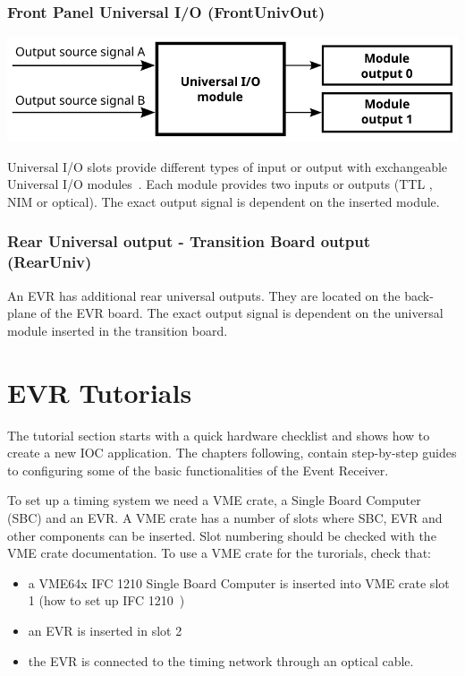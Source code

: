 \documentclass[12pt,a4paper]{article}
\begin{document}
\subsubsection{Front Panel Universal I/O (FrontUnivOut)}

	\includegraphics[]{./img/univ}

Universal I/O slots provide different types of input or output with exchangeable Universal I/O modules~\cite{mrf_modules}. Each module provides two inputs or outputs (TTL , NIM or optical). 
The exact output signal is dependent on the inserted module.

\subsubsection{Rear Universal output - Transition Board output (RearUniv)}
An EVR has additional rear universal outputs. They are located on the back-plane of the EVR board. The exact output signal is dependent on the universal module inserted in the transition board.

\section{EVR Tutorials}
The tutorial section starts with a quick hardware checklist and shows how to create a new IOC application. The chapters following, contain step-by-step guides to configuring some of the basic functionalities of the Event Receiver.

To set up a timing system we need a VME crate, a Single Board Computer (SBC) and an EVR. A VME crate has a number of slots where SBC, EVR and other components can be inserted. Slot numbering should be checked with the VME crate documentation. To use a VME crate for the turorials, check that:
\begin{itemize}
	 \item a VME64x IFC 1210 Single Board Computer is inserted into VME crate slot 1 (how to set up IFC 1210~\cite{ifc})
	\item  an EVR is inserted in slot 2
	\item the EVR is connected to the timing network through an optical cable.
\end{itemize}
\end{document}
